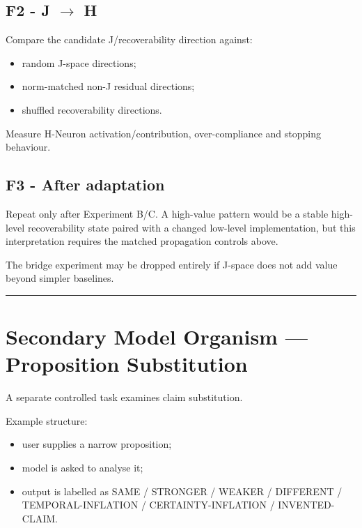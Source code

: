 \subsection{F2 - J \texorpdfstring{$\rightarrow$}{->} H}\label{f2---j---h}

Compare the candidate J/recoverability direction against:

\begin{itemize}
\tightlist
\item random J-space directions;
\item norm-matched non-J residual directions;
\item shuffled recoverability directions.
\end{itemize}

Measure H-Neuron activation/contribution, over-compliance and stopping behaviour.

\subsection{F3 - After adaptation}\label{f3---after-adaptation}

Repeat only after Experiment B/C. A high-value pattern would be a stable high-level recoverability state paired with a changed low-level implementation, but this interpretation requires the matched propagation controls above.

The bridge experiment may be dropped entirely if J-space does not add value beyond simpler baselines.

\begin{center}\rule{0.5\linewidth}{0.5pt}\end{center}

\section{Secondary Model Organism --- Proposition Substitution}\label{secondary-model-organism-proposition-substitution}

A separate controlled task examines claim substitution.

Example structure:

\begin{itemize}
\tightlist
\item
  user supplies a narrow proposition;
\item
  model is asked to analyse it;
\item
  output is labelled as SAME / STRONGER / WEAKER / DIFFERENT / TEMPORAL-INFLATION / CERTAINTY-INFLATION / INVENTED-CLAIM.
\end{itemize}

